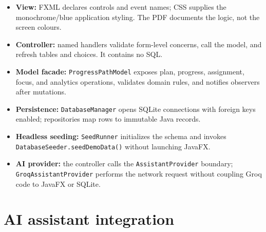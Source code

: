 \documentclass[11pt,a4paper]{article}
\newcommand{\code}[1]{\texttt{#1}}
\begin{document}
\begin{center}
\end{center}

\begin{itemize}
  \item \textbf{View:} FXML declares controls and event names; CSS supplies the monochrome/blue application styling. The PDF documents the logic, not the screen colours.
  \item \textbf{Controller:} named handlers validate form-level concerns, call the model, and refresh tables and choices. It contains no SQL.
  \item \textbf{Model facade:} \code{ProgressPathModel} exposes plan, progress, assignment, focus, and analytics operations, validates domain rules, and notifies observers after mutations.
  \item \textbf{Persistence:} \code{DatabaseManager} opens SQLite connections with foreign keys enabled; repositories map rows to immutable Java records.
  \item \textbf{Headless seeding:} \code{SeedRunner} initializes the schema and invokes \code{DatabaseSeeder.seedDemoData()} without launching JavaFX.
  \item \textbf{AI provider:} the controller calls the \code{AssistantProvider} boundary; \code{GroqAssistantProvider} performs the network request without coupling Groq code to JavaFX or SQLite.
\end{itemize}

\section{AI assistant integration}
\end{document}
